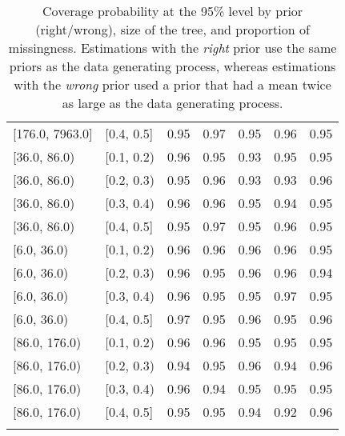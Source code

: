 \begin{table}[ht]
\begin{tabular}{llrrrrr}
  {[176.0, 7963.0]} & {[0.4, 0.5]} & 0.95 & 0.97 & 0.95 & 0.96 & 0.95 \\ 
  {[36.0, 86.0)} & {[0.1, 0.2)} & 0.96 & 0.95 & 0.93 & 0.95 & 0.95 \\ 
  {[36.0, 86.0)} & {[0.2, 0.3)} & 0.95 & 0.96 & 0.93 & 0.93 & 0.96 \\ 
  {[36.0, 86.0)} & {[0.3, 0.4)} & 0.96 & 0.96 & 0.95 & 0.94 & 0.95 \\ 
  {[36.0, 86.0)} & {[0.4, 0.5]} & 0.95 & 0.97 & 0.95 & 0.96 & 0.95 \\ 
  {[6.0, 36.0)} & {[0.1, 0.2)} & 0.96 & 0.96 & 0.96 & 0.96 & 0.95 \\ 
  {[6.0, 36.0)} & {[0.2, 0.3)} & 0.96 & 0.95 & 0.96 & 0.96 & 0.94 \\ 
  {[6.0, 36.0)} & {[0.3, 0.4)} & 0.96 & 0.95 & 0.95 & 0.97 & 0.95 \\ 
  {[6.0, 36.0)} & {[0.4, 0.5]} & 0.97 & 0.95 & 0.96 & 0.95 & 0.96 \\ 
  {[86.0, 176.0)} & {[0.1, 0.2)} & 0.96 & 0.96 & 0.95 & 0.95 & 0.95 \\ 
  {[86.0, 176.0)} & {[0.2, 0.3)} & 0.94 & 0.95 & 0.96 & 0.94 & 0.96 \\ 
  {[86.0, 176.0)} & {[0.3, 0.4)} & 0.96 & 0.94 & 0.95 & 0.95 & 0.95 \\ 
  {[86.0, 176.0)} & {[0.4, 0.5]} & 0.95 & 0.95 & 0.94 & 0.92 & 0.96 \\ 
   \bottomrule
\multicolumn{7}{l}{}\\
\end{tabular}
\caption{Coverage probability at the 95\% level by prior (right/wrong), size of the tree, and proportion of missingness.  Estimations with the \emph{right} prior use the same priors as the data generating process, whereas estimations with the \emph{wrong} prior used a prior that had a mean twice as large as the data generating process.} 
\label{tab:coverage95-method-size-missigness}
\end{table}
